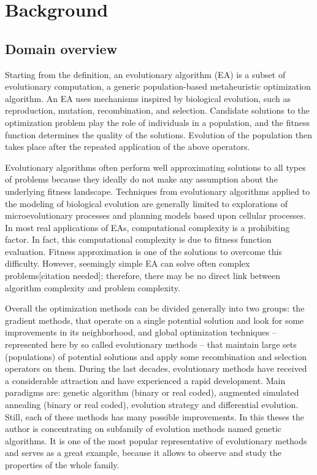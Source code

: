 \chapter{Background}

\section{Domain overview}

Starting from the definition, an evolutionary algorithm (EA) is a subset of evolutionary computation, a generic population-based metaheuristic optimization algorithm. An EA uses mechanisms inspired by biological evolution, such as reproduction, mutation, recombination, and selection. Candidate solutions to the optimization problem play the role of individuals in a population, and the fitness function determines the quality of the solutions. Evolution of the population then takes place after the repeated application of the above operators.

Evolutionary algorithms often perform well approximating solutions to all types of problems because they ideally do not make any assumption about the underlying fitness landscape. Techniques from evolutionary algorithms applied to the modeling of biological evolution are generally limited to explorations of microevolutionary processes and planning models based upon cellular processes. In most real applications of EAs, computational complexity is a prohibiting factor. In fact, this computational complexity is due to fitness function evaluation. Fitness approximation is one of the solutions to overcome this difficulty. However, seemingly simple EA can solve often complex problems[citation needed]; therefore, there may be no direct link between algorithm complexity and problem complexity.

Overall the optimization methods can be divided generally into two groups: the gradient methods, that operate on a single potential solution and look for some improvements in its neighborhood, and global optimization techniques – represented here by so called evolutionary methods – that maintain large sets (populations) of potential solutions and apply some recombination and selection operators on them. During the last decades, evolutionary methods have received a considerable attraction and have experienced a rapid development. Main paradigms are: genetic algorithm (binary or real coded), augmented simulated annealing (binary or real coded), evolution strategy and differential evolution. Still, each of these methods has many possible improvements.
In this theses the author is concentrating on subfamily of evolution methods named genetic algorithms. It is one of the most popular representative of evolutionary methods and serves as a great example, because it allows to observe and study the properties of the whole family.

